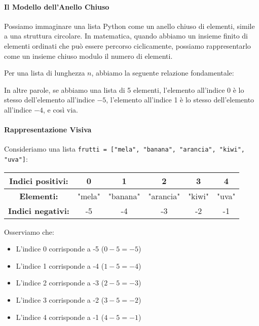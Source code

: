 \paragraph{Il Modello dell'Anello Chiuso}
Possiamo immaginare una lista Python come un anello chiuso di elementi, simile a una struttura circolare. In matematica, quando abbiamo un insieme finito di elementi ordinati che può essere percorso ciclicamente, possiamo rappresentarlo come un insieme chiuso modulo il numero di elementi.

Per una lista di lunghezza $n$, abbiamo la seguente relazione fondamentale:

\begin{center}
\end{center}

In altre parole, se abbiamo una lista di 5 elementi, l'elemento all'indice 0 è lo stesso dell'elemento all'indice $-5$, l'elemento all'indice 1 è lo stesso dell'elemento all'indice $-4$, e così via.

\paragraph{Rappresentazione Visiva}
Consideriamo una lista \texttt{frutti = ["mela", "banana", "arancia", "kiwi", "uva"]}:

\begin{center}
\begin{tabular}{|c|c|c|c|c|c|}
\hline
\textbf{Indici positivi:} & 0 & 1 & 2 & 3 & 4 \\
\hline
\textbf{Elementi:} & "mela" & "banana" & "arancia" & "kiwi" & "uva" \\
\hline
\textbf{Indici negativi:} & -5 & -4 & -3 & -2 & -1 \\
\hline
\end{tabular}
\end{center}

Osserviamo che:
\begin{itemize}
    \item L'indice 0 corrisponde a -5 \quad ($0 - 5 = -5$)
    \item L'indice 1 corrisponde a -4 \quad ($1 - 5 = -4$)
    \item L'indice 2 corrisponde a -3 \quad ($2 - 5 = -3$)
    \item L'indice 3 corrisponde a -2 \quad ($3 - 5 = -2$)
    \item L'indice 4 corrisponde a -1 \quad ($4 - 5 = -1$)
\end{itemize}

